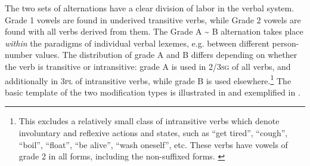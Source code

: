 \documentclass[output=paper
,newtxmath
,modfonts
,nonflat]{langsci/langscibook}
\begin{document}
The two sets of alternations have a clear division of labor in the verbal system. Grade 1 vowels are found in underived transitive verbs, while Grade 2 vowels are found with all verbs derived from them. The Grade A {\textasciitilde} B alternation takes place \textit{within} the paradigms of individual verbal lexemes, e.g. between different  person-number values. The distribution of grade A and B differs depending on whether the verb is transitive or intransitive: grade A is used in 2/3\textsc{sg} of all verbs, and additionally in 3\textsc{pl} of intransitive verbs, while grade B is used elsewhere.\footnote{This excludes a relatively small class of intransitive verbs which denote involuntary and reflexive actions and states, such as “get tired”, “cough”, “boil”, “float”, “be alive”, “wash oneself”, etc. These verbs have vowels of grade 2 in all forms, including the non-suffixed forms. \label{fn:monich:5} }  The basic template of the two  modification types is illustrated in  and exemplified in . 

\end{document}
